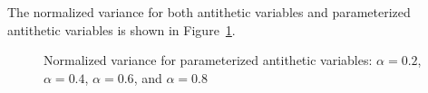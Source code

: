 \documentclass[11pt]{article}
\begin{document}
The normalized variance for both antithetic variables and parameterized antithetic variables is shown in Figure~\ref{fig:pav}.
\begin{figure}[ht!]
\centering
{}
\label{fig:subfigureExample}
\caption[Normalized variance for parameterized antithetic variables]{Normalized variance for parameterized antithetic variables:  $\alpha = 0.2$,  $\alpha = 0.4$,  $\alpha = 0.6$, and  $\alpha = 0.8$}\label{fig:pav}
\end{figure}
\end{document}
